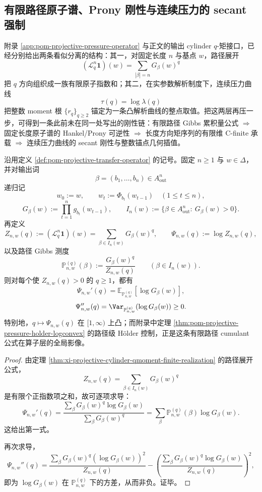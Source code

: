 \subsection{有限路径原子谱、Prony 刚性与连续压力的 secant 强制}

附录 \ref{app:pom-projective-pressure-operator} 与正文的输出 cylinder \(q\)-矩接口，已经分别给出两条看似分离的结构：其一，对固定长度 \(n\) 与基点 \(w\)，路径展开
\[
(\mathcal L_q^n\mathbf 1)(w)=\sum_{|\beta|=n}G_\beta(w)^q
\]
把 \(q\) 方向组织成一族有限原子指数和；其二，在实参数解析制度下，连续压力曲线
\[
\tau(q)=\log\lambda(q)
\]
把整数 moment 根 \(\{r_q\}_{q\ge 2}\) 锚定为一条凸解析曲线的整点取值。把这两层再压一步，可得到一条此前未在同一处写出的刚性链：有限路径 Gibbs 累积量公式 \(\Longrightarrow\) 固定长度原子谱的 Hankel/Prony 可逆性 \(\Longrightarrow\) 长度方向矩序列的有限维 C-finite 承载 \(\Longrightarrow\) 连续压力曲线的 secant 刚性与整数锚点几何插值。

\begin{theorem}\label{thm:derived-projective-path-gibbs-cumulants}
沿用定义 \ref{def:pom-projective-transfer-operator} 的记号。固定 \(n\ge 1\) 与 \(w\in\Delta\)，并对输出词
\[
\beta=(b_1,\dots,b_n)\in A_{\mathrm{out}}^n
\]
递归记
\[
w_0:=w,
\qquad
w_t:=\Phi_{b_t}(w_{t-1})\quad(1\le t\le n),
\]
\[
G_\beta(w):=\prod_{t=1}^{n}g_{b_t}(w_{t-1}),
\qquad
I_n(w):=\{\beta\in A_{\mathrm{out}}^n:\ G_\beta(w)>0\}.
\]
再定义
\[
Z_{n,w}(q):=(\mathcal L_q^n\mathbf 1)(w)=\sum_{\beta\in I_n(w)}G_\beta(w)^q,
\qquad
\Psi_{n,w}(q):=\log Z_{n,w}(q),
\]
以及路径 Gibbs 测度
\[
\mathbb P_{n,w}^{(q)}(\beta):=\frac{G_\beta(w)^q}{Z_{n,w}(q)}
\qquad(\beta\in I_n(w)).
\]
则对每个使 \(Z_{n,w}(q)>0\) 的 \(q\ge 1\)，都有
\[
\Psi_{n,w}'(q)
=
\mathbb E_{\mathbb P_{n,w}^{(q)}}[\log G_\beta(w)],
\]
\[
\Psi_{n,w}''(q)
=
\Var_{\mathbb P_{n,w}^{(q)}}(\log G_\beta(w))
\ge 0.
\]
特别地，\(q\mapsto \Psi_{n,w}(q)\) 在 \([1,\infty)\) 上凸；而附录中定理 \ref{thm:pom-projective-pressure-holder-logconvex} 的路径级 Hölder 控制，正是这条有限路径 cumulant 公式在算子层的全局影像。
\end{theorem}

\begin{proof}
由定理 \ref{thm:xi-projective-cylinder-qmoment-finite-realization} 的路径展开公式，
\[
Z_{n,w}(q)=\sum_{\beta\in I_n(w)}G_\beta(w)^q
\]
是有限个正指数项之和，故可逐项求导：
\[
\Psi_{n,w}'(q)
=
\frac{\sum_{\beta}G_\beta(w)^q\log G_\beta(w)}{\sum_{\beta}G_\beta(w)^q}
=
\sum_{\beta}\mathbb P_{n,w}^{(q)}(\beta)\log G_\beta(w).
\]
这给出第一式。

再次求导，
\[
\Psi_{n,w}''(q)
=
\frac{\sum_{\beta}G_\beta(w)^q(\log G_\beta(w))^2}{Z_{n,w}(q)}
-
\left(
\frac{\sum_{\beta}G_\beta(w)^q\log G_\beta(w)}{Z_{n,w}(q)}
\right)^2,
\]
即为 \(\log G_\beta(w)\) 在 \(\mathbb P_{n,w}^{(q)}\) 下的方差，从而非负。证毕。
\end{proof}


